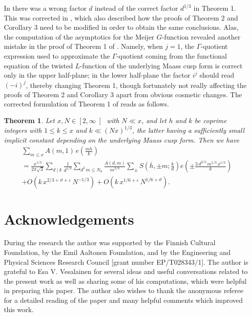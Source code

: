 \documentclass[a4paper,10pt,twoside]{amsart}
\newtheorem{theorem}{Theorem}[section]
\theoremstyle{definition}
\numberwithin{equation}{section}
\renewcommand\:{\colon}
\begin{document}
\noindent In \cite{Jaasaari--Vesalainen1} there was a wrong factor $d$ instead of the correct factor $d^{1/3}$ in Theorem 1. This was corrected in \cite{Jaasaari--Vesalainen3}, which also described how the proofs of Theorem 2 and Corollary 3 need to be modified in order to obtain the same conclusions. Alas, the computation of the asymptotics for the Meijer $G$-function revealed another mistake in the proof of Theorem 1 of \cite{Jaasaari--Vesalainen1}. Namely, when $j=1$, the $\Gamma$-quotient expression used to approximate the $\Gamma$-quotient coming from the functional equation of the twisted $L$-function of the underlying Maass cusp form is correct only in the upper half-plane; in the lower half-plane the factor $i^j$ should read $(-i)^j$, thereby changing Theorem 1, though fortunately not really affecting the proofs of Theorem 2 and Corollary 3 apart from obvious cosmetic changes. The corrected formulation of Theorem 1 of \cite{Jaasaari--Vesalainen1} reads as follows.
\begin{theorem}
Let $x,N\in\left[2,\infty\right[$ with $N\ll x$, and let $h$ and $k$ be coprime integers with $1\leqslant k\leqslant x$ and $k\ll\left(Nx\right)^{1/3}$, the latter having a sufficiently small implicit constant depending on the underlying Maass cusp form. Then we have
\begin{multline*}
\sum_{m\leqslant x}A(m,1)\,e\!\left(\frac{mh}k\right)\\
=\frac{x^{1/3}}{2\pi\sqrt3}\sum_{d\mid k}\frac1{d^{1/3}}\sum_{d^2\,m\leqslant N_k}\frac{A(d,m)}{m^{2/3}}\sum_\pm S\!\left(\overline h,\pm m;\frac kd\right)e\!\left(\pm\frac{3\,d^{2/3}\,m^{1/3}\,x^{1/3}}k\right)\\
+O(k\,x^{2/3+\vartheta+\varepsilon}\,N^{-1/3})+O(k\,x^{1/6+\varepsilon}\,N^{1/6+\vartheta}).
\end{multline*}
\end{theorem}

\section*{Acknowledgements}

\noindent During the research the author was supported by the Finnish Cultural Foundation, by the Emil Aaltonen Foundation, and by the Engineering and Physical Sciences Research Council [grant number EP/T028343/1]. The author is grateful to Esa V. Vesalainen for several ideas and useful conversations related to the present work as well as sharing some of his computations, which were helpful in preparing this paper. The author also wishes to thank the anonymous referee for a detailed reading of the paper and many helpful comments which improved this work.


{}

\end{document}
